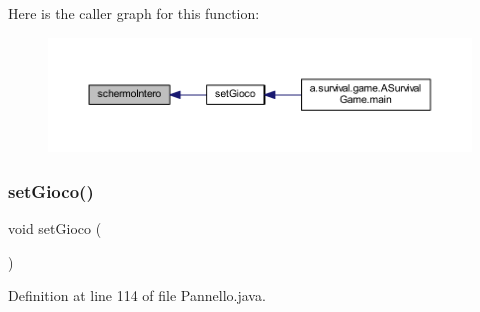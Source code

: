 Here is the caller graph for this function\+:
\nopagebreak
\begin{figure}[H]
\begin{center}
\leavevmode
\includegraphics[width=350pt]{classa_1_1survival_1_1game_1_1_pannello_afcdfb03d382a1f735d929602329d276b_icgraph}
\end{center}
\end{figure}
\mbox{\label{classa_1_1survival_1_1game_1_1_pannello_a656b18ea5779c5d29c83a5abea629534}} 
\subsubsection{\texorpdfstring{set\+Gioco()}{setGioco()}}
{\footnotesize\ttfamily void set\+Gioco (\begin{DoxyParamCaption}{ }\end{DoxyParamCaption})}



Definition at line 114 of file Pannello.\+java.


